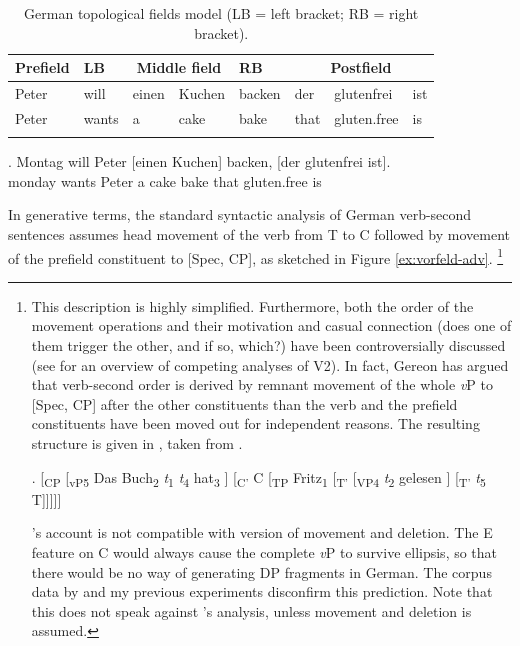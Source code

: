 \begin{table}[t]
\begin{tabular}{l l l l l l l l}
\lsptoprule
Prefield & LB & \multicolumn{2}{c}{Middle field} & RB & \multicolumn{3}{c}{Postfield}  \\   
\midrule
Peter & will & einen & Kuchen & backen & der & glutenfrei & ist\\
Peter & wants & a & cake & bake & that & gluten.free & is\\
\lspbottomrule
\end{tabular}
\caption{German topological fields model (LB = left bracket; RB = right bracket).\label{tab:feldermodell}}
\end{table}

\exg. Montag will Peter [einen Kuchen] backen, [der glutenfrei ist].\\
monday wants Peter a cake bake that gluten.free is\\

In generative terms, the standard syntactic analysis of German verb-second sentences assumes head movement of the verb from T to C followed by movement of the prefield constituent to [Spec, CP], as sketched in Figure \ref{ex:vorfeld-adv}.%
%
\footnote{This description is highly simplified. Furthermore, both the order of the movement operations and their motivation and casual connection (does one of them trigger the other, and if so, which?) have been controversially discussed (see \citet{brandner2004} for an overview of competing analyses of V2). In fact, Gereon \citet{muller2004} has argued that verb-second order is derived by remnant movement of the whole \textit{v}P to [Spec, CP] after the other constituents than the verb and the prefield constituents have been moved out for independent reasons. The resulting structure is given in \Next, taken from \citep[181]{muller2004}.

\ex. [\textsubscript{CP} [\textsubscript{vP}\textsubscript{5} Das Buch\textsubscript{2} \textit{t}\textsubscript{1} \textit{t}\textsubscript{4} hat\textsubscript{3} ] [\textsubscript{C'} C [\textsubscript{TP} Fritz\textsubscript{1} [\textsubscript{T'} [\textsubscript{VP}\textsubscript{4} \textit{t}\textsubscript{2} gelesen ] [\textsubscript{T'} \textit{t}\textsubscript{5} T]]]]]

\citeauthor{muller2004}'s account is not compatible with  version of movement and deletion. The E feature on C would always cause the complete \textit{v}P to survive ellipsis, so that there would be no way of generating DP fragments in German. The corpus data by \citet{reich2017} and my previous experiments disconfirm this prediction. Note that this does not speak against \citeauthor{muller2004}'s analysis, unless movement and deletion is assumed.}\afterfn%
%

